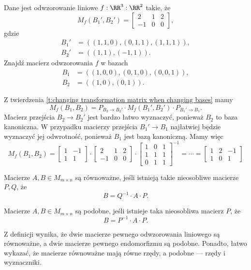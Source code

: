 \begin{example}
    Dane jest odwzorowanie liniowe $f : \RR^3 : \RR^2$ takie, że
    \[ M_f(B_1', B_2') = \begin{bmatrix}
        2 & 1 & 2 \\
        -1 & 0 & 0
    \end{bmatrix}, \]
    gdzie
    \begin{align*}
        B_1' &= ((1, 1, 0), (0, 1, 1), (1, 1, 1)), \\
        B_2' &= ((1, 1), (-1, 1)).
    \end{align*}
    Znajdź macierz odwzorowania $f$ w bazach
    \begin{align*}
        B_1 &= ((1, 0, 0), (0, 1, 0), (0, 0, 1)), \\
        B_2 &= ((1, 0), (0, 1)).
    \end{align*}
\end{example}
\begin{solution}
    Z twierdzenia \ref{t:changing transformation matrix when changing bases} mamy
    \[ M_f(B_1, B_2) = P_{B_2 \to B_2'} \cdot M_f(B_1', B_2') \cdot P_{B_1' \to B_1}. \]
    Macierz przejścia $B_2 \to B_2'$ jest bardzo łatwo wyznaczyć, ponieważ $B_2$ to baza kanoniczna. W przypadku macierzy przejścia $B_1' \to B_1$ najłatwiej będzie wyznaczyć jej odwrotność, ponieważ $B_1$ jest bazą kanoniczną. Mamy więc
    \[ M_f(B_1, B_2) = \begin{bmatrix}
        1 & -1 \\
        1 & 1
    \end{bmatrix} \cdot \begin{bmatrix}
        2 & 1 & 2 \\
        -1 & 0 & 0
    \end{bmatrix} \cdot \begin{bmatrix}
        1 & 0 & 1\\
        1 & 1 & 1\\
        0 & 1 & 1
    \end{bmatrix}^{-1} = \cdots = \begin{bmatrix}
        1 & 2 & -1 \\
        1 & 0 & 1
    \end{bmatrix} \]
\end{solution}

\begin{definition}
    \label{d:matrix equivalence}
    Macierze $A, B \in M_{m\times n}$ są równoważne, jeśli istnieją takie nieosobliwe macierze $P, Q$, że
    \[ B = Q^{-1} \cdot A \cdot P. \]
\end{definition}

\begin{definition}
    \label{d:matrix similarity}
    Macierze $A, B \in M_{m\times n}$ są podobne, jeśli istnieje taka nieosobliwa macierz $P$, że
    \[ B = P^{-1} \cdot A \cdot P. \]
\end{definition}

Z definicji wynika, że dwie macierze pewnego odwzorowania liniowego są równoważne, a dwie macierze pewnego endomorfizmu są podobne. Ponadto, łatwo wykazać, że macierze równoważne mają równe rzędy, a podobne --- rzędy i wyznaczniki.